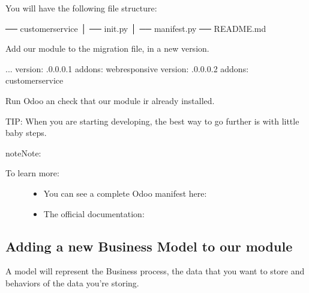 \documentclass[letterpaper,10pt,english]{sphinxmanual}
\begin{document}
You will have the following file structure:

\begin{sphinxVerbatim}[commandchars=\\\{\}]
── customer\PYGZus{}service
│   ── \PYGZus{}\PYGZus{}init\PYGZus{}\PYGZus{}.py  
│   ── \PYGZus{}\PYGZus{}manifest\PYGZus{}\PYGZus{}.py  
── README.md  
\end{sphinxVerbatim}

Add our module to the migration file, in a new version.

%
\begin{sphinxVerbatim}[commandchars=\\\{\}]
    \PYG{o}{[}...\PYG{o}{]}
    \PYGZhy{} version: .0.0.0.1
      addons:
          \PYGZhy{} web\PYGZus{}responsive
    \PYGZhy{} version: .0.0.0.2
      addons:
          \PYGZhy{} customer\PYGZus{}service
\end{sphinxVerbatim}
\sphinxresetverbatimhllines

Run Odoo an check that our module ir already installed.

TIP: When you are starting developing, the best way to go further is with little baby steps.

\begin{sphinxadmonition}{note}{Note:}\begin{description}
\item[{To learn more:}] \leavevmode\begin{itemize}
\item {} 
You can see a complete Odoo manifest here: 

\item {} 
The official documentation: 

\end{itemize}

\end{description}
\end{sphinxadmonition}


\subsection{Adding a new Business Model to our module}
\label{\detokenize{technical:adding-a-new-business-model-to-our-module}}
A model will represent the Business process, the data that you want to store and
behaviors of the data you’re storing.
\end{document}
